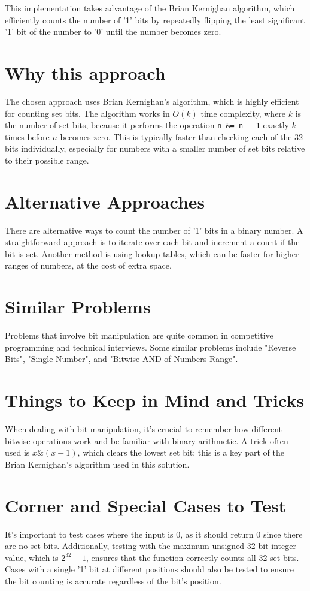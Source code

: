 This implementation takes advantage of the Brian Kernighan algorithm, which efficiently counts the number of '1' bits by repeatedly flipping the least significant '1' bit of the number to '0' until the number becomes zero.

\section*{Why this approach}
The chosen approach uses Brian Kernighan's algorithm, which is highly efficient for counting set bits. The algorithm works in \(O(k)\) time complexity, where \(k\) is the number of set bits, because it performs the operation \texttt{n \&= n - 1} exactly \(k\) times before \(n\) becomes zero. This is typically faster than checking each of the 32 bits individually, especially for numbers with a smaller number of set bits relative to their possible range.

\section*{Alternative Approaches}
There are alternative ways to count the number of '1' bits in a binary number. A straightforward approach is to iterate over each bit and increment a count if the bit is set. Another method is using lookup tables, which can be faster for higher ranges of numbers, at the cost of extra space.

\section*{Similar Problems}
Problems that involve bit manipulation are quite common in competitive programming and technical interviews. Some similar problems include "Reverse Bits", "Single Number", and "Bitwise AND of Numbers Range".

\section*{Things to Keep in Mind and Tricks}
When dealing with bit manipulation, it's crucial to remember how different bitwise operations work and be familiar with binary arithmetic. A trick often used is \(x \& (x-1)\), which clears the lowest set bit; this is a key part of the Brian Kernighan's algorithm used in this solution.

\section*{Corner and Special Cases to Test}
It's important to test cases where the input is 0, as it should return 0 since there are no set bits. Additionally, testing with the maximum unsigned 32-bit integer value, which is \(2^{32} - 1\), ensures that the function correctly counts all 32 set bits. Cases with a single '1' bit at different positions should also be tested to ensure the bit counting is accurate regardless of the bit's position.
